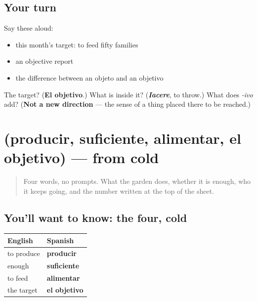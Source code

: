\subsection*{Your turn}
Say these aloud:

\begin{itemize}
\raggedright
  \item this month's target: to feed fifty families
  \item an objective report
  \item the difference between an objeto and an objetivo
\end{itemize}

\begin{tcolorbox}[breakable,colback=teal!4,colframe=teal!35!black,title={Before you move on}]
The target? (\textbf{El objetivo}.) What is inside it? (\emph{\textbf{Iacere}}, to throw.) What does \emph{-ivo} add? (\textbf{Not a new direction} — the sense of a thing placed there to be reached.)
\end{tcolorbox}
\section[(producir, suficiente, alimentar, el …]{(producir, suficiente, alimentar, el objetivo) — from cold}

\label{lesson:ES-R467-repaso-alimento}



\begin{quote}
Four words, no prompts. What the garden does, whether it is enough, who it keeps going, and the number written at the top of the sheet.
\end{quote}

\subsection*{You'll want to know: the four, cold}
\noindent
\begin{tabularx}{\linewidth}{@{}>{\raggedright\arraybackslash}X>{\raggedright\arraybackslash}X@{}}
\toprule
\textbf{English} & \textbf{Spanish} \\
\midrule
to produce & \textbf{producir} \\
enough & \textbf{suficiente} \\
to feed & \textbf{alimentar} \\
the target & \textbf{el objetivo} \\
\bottomrule
\end{tabularx}

